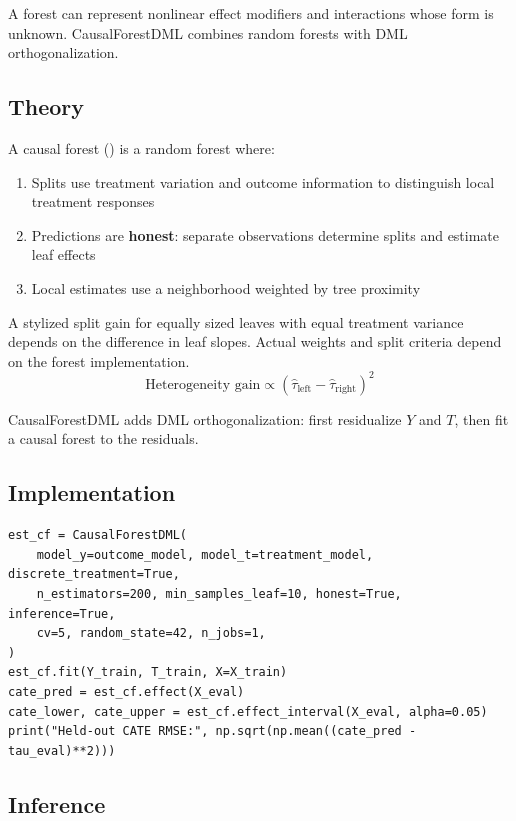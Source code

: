 A forest can represent nonlinear effect modifiers and interactions whose form is unknown. CausalForestDML combines random forests with DML orthogonalization.

\subsection{Theory}

\begin{definition}
\label{def:causal_forest}
A causal forest (\cite{wager2018estimation}) is a random forest where:
\begin{enumerate}
    \item Splits use treatment variation and outcome information to distinguish local treatment responses
    \item Predictions are \textbf{honest}: separate observations determine splits and estimate leaf effects
    \item Local estimates use a neighborhood weighted by tree proximity
\end{enumerate}
A stylized split gain for equally sized leaves with equal treatment variance depends on the difference in leaf slopes. Actual weights and split criteria depend on the forest implementation.
\begin{equation}
\text{Heterogeneity gain} \propto (\hat{\tau}_{\text{left}} - \hat{\tau}_{\text{right}})^2
\end{equation}
\end{definition}

CausalForestDML adds DML orthogonalization: first residualize $Y$ and $T$, then fit a causal forest to the residuals.

\subsection{Implementation}

\begin{verbatim}
est_cf = CausalForestDML(
    model_y=outcome_model, model_t=treatment_model, discrete_treatment=True,
    n_estimators=200, min_samples_leaf=10, honest=True, inference=True,
    cv=5, random_state=42, n_jobs=1,
)
est_cf.fit(Y_train, T_train, X=X_train)
cate_pred = est_cf.effect(X_eval)
cate_lower, cate_upper = est_cf.effect_interval(X_eval, alpha=0.05)
print("Held-out CATE RMSE:", np.sqrt(np.mean((cate_pred - tau_eval)**2)))
\end{verbatim}

\subsection{Inference}


